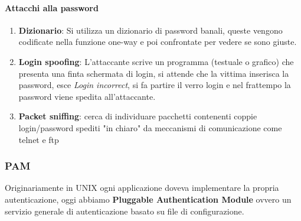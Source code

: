 \documentclass[a4paper,12pt]{article}
\begin{document}
\paragraph{Attacchi alla password} 
\begin{enumerate}
  \item \textbf{Dizionario}: Si utilizza un dizionario di password banali, queste vengono codificate nella funzione one-way e poi confrontate per vedere se sono giuste.
  \item \textbf{Login spoofing}: L'attaccante scrive un programma (testuale o grafico) che presenta una finta schermata di login, si attende che la vittima inserisca la password, esce \textit{Login incorrect}, si fa partire il verro login e nel frattempo la password viene spedita all'attaccante.
  \item \textbf{Packet sniffing}: cerca di individuare pacchetti contenenti coppie login/password
spediti "in chiaro" da meccanismi di comunicazione come telnet
e ftp
\end{enumerate}
\subsubsection*{PAM} 
Originariamente in UNIX ogni applicazione doveva implementare la propria autenticazione, oggi abbiamo \textbf{Pluggable Authentication Module} ovvero un servizio generale di autenticazione basato su file di
configurazione.
\end{document}
